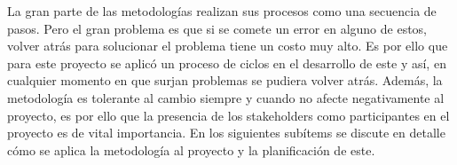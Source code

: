 La gran parte de las metodologías realizan sus procesos como una secuencia de pasos. Pero el gran problema es que si se comete un error en alguno de estos, volver atrás para solucionar el problema tiene un costo muy alto. Es por ello que para este proyecto se aplicó un proceso de ciclos en el desarrollo de este y así, en cualquier momento en que surjan problemas se pudiera volver atrás. Además, la metodología es tolerante al cambio siempre y cuando no afecte negativamente al proyecto, es por ello que la presencia de los stakeholders como participantes en el proyecto es de vital importancia. En los siguientes subítems se discute en detalle cómo se aplica la metodología al proyecto y la planificación de este.